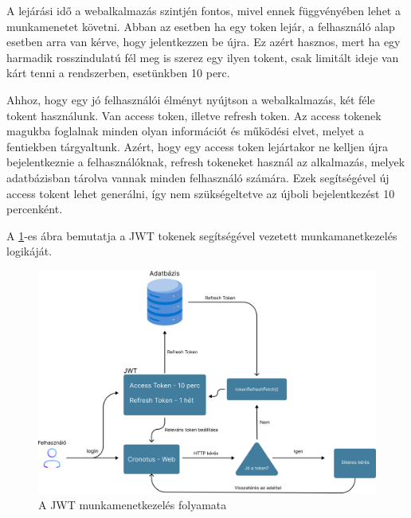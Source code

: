 A lejárási idő a webalkalmazás szintjén fontos, mivel ennek függvényében lehet a munkamenetet követni. Abban az esetben ha egy token lejár, a felhasználó alap esetben arra van kérve, hogy jelentkezzen be újra. Ez azért hasznos, mert ha egy harmadik rosszindulatú fél meg is szerez egy ilyen tokent, csak limitált ideje van kárt tenni a rendszerben, esetünkben 10 perc.

Ahhoz, hogy egy jó felhasználói élményt nyújtson a webalkalmazás, két féle tokent használunk. Van access token, illetve refresh token. Az access tokenek magukba foglalnak minden olyan információt és működési elvet, melyet a fentiekben tárgyaltunk. Azért, hogy egy access token lejártakor ne kelljen újra bejelentkeznie a felhasználóknak, refresh tokeneket használ az alkalmazás, melyek adatbázisban tárolva vannak minden felhasználó számára. Ezek segítségével új access tokent lehet generálni, így nem szükségeltetve az újboli bejelentkezést 10 percenként.

A \ref{fig:jwt_auth_process}-es ábra bemutatja a JWT tokenek segítségével vezetett munkamanetkezelés logikáját.

\clearpage

\begin{figure}[h]
  \centering
  \includegraphics[width=\textwidth]{images/jwt_auth_process.png}
  \caption{A JWT munkamenetkezelés folyamata}
  \label{fig:jwt_auth_process}
\end{figure}

  